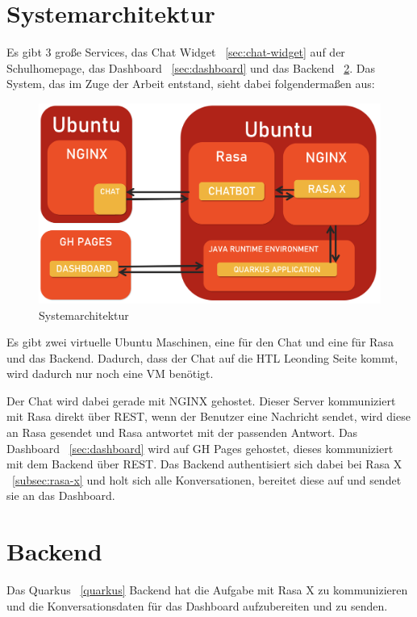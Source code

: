 \section{Systemarchitektur}\label{sec:systemarchitektur}

Es gibt 3 große Services, das Chat Widget ~\ref{sec:chat-widget} auf der Schulhomepage, das Dashboard ~\ref{sec:dashboard} und das Backend ~\ref{sec:backend}.
Das System, das im Zuge der Arbeit entstand, sieht dabei folgendermaßen aus:

\begin{figure}[hbt!]
    \centering
    \includegraphics[scale=0.2]{pics/systemarchitektur}
    \caption{Systemarchitektur}
    \label{fig:impl:architektur}
\end{figure}

Es gibt zwei virtuelle Ubuntu Maschinen, eine für den Chat und eine für Rasa und das Backend.
Dadurch, dass der Chat auf die HTL Leonding Seite kommt, wird dadurch nur noch eine VM benötigt.

Der Chat wird dabei gerade mit NGINX gehostet.
Dieser Server kommuniziert mit Rasa direkt über REST, wenn der Benutzer eine Nachricht sendet, wird diese an Rasa gesendet und Rasa antwortet mit der passenden Antwort.
Das Dashboard ~\ref{sec:dashboard} wird auf GH Pages gehostet, dieses kommuniziert mit dem Backend über REST.
Das Backend authentisiert sich dabei bei Rasa X ~\ref{subsec:rasa-x} und holt sich alle Konversationen, bereitet diese auf und sendet sie an das Dashboard.

\section{Backend}\label{sec:backend}

Das Quarkus ~\ref{quarkus} Backend hat die Aufgabe mit Rasa X zu kommunizieren und die Konversationsdaten für das Dashboard aufzubereiten und zu senden.


